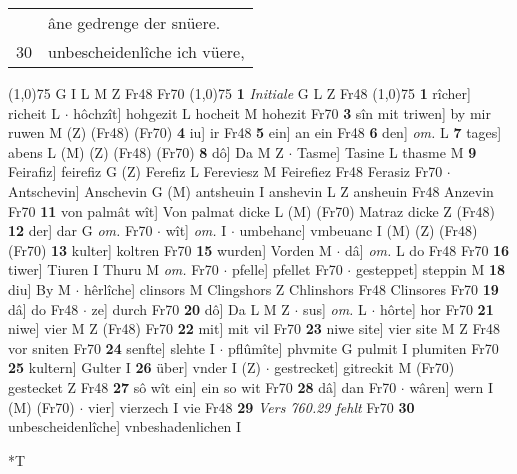 \documentclass[8pt,a4paper,notitlepage]{article}
\begin{document}
\begin{table}[ht]
\begin{minipage}[t]{0.5\linewidth}
\begin{tabular}{rl}
 & âne gedrenge der snüere.\\ 
30 & unbescheidenlîche ich vüere,\\ 
\end{tabular}
\scriptsize
\line(1,0){75} \newline
G I L M Z Fr48 Fr70 \newline
\line(1,0){75} \newline
\textbf{1} \textit{Initiale} G L Z Fr48  \newline
\line(1,0){75} \newline
\textbf{1} rîcher] richeit L  $\cdot$ hôchzît] hohgezit L hocheit M hohezit Fr70 \textbf{3} sîn mit triwen] by mir ruwen M (Z) (Fr48) (Fr70) \textbf{4} iu] ir Fr48 \textbf{5} ein] an ein Fr48 \textbf{6} den] \textit{om.} L \textbf{7} tages] abens L (M) (Z) (Fr48) (Fr70) \textbf{8} dô] Da M Z  $\cdot$ Tasme] Tasine L thasme M \textbf{9} Feirafiz] feirefiz G (Z) Ferefiz L Fereviesz M Feirefiez Fr48 Ferasiz Fr70  $\cdot$ Antschevin] Anschevin G (M) antsheuin I anshevin L Z ansheuin Fr48 Anzevin Fr70 \textbf{11} von palmât wît] Von palmat dicke L (M) (Fr70) Matraz dicke Z (Fr48) \textbf{12} der] dar G \textit{om.} Fr70  $\cdot$ wît] \textit{om.} I  $\cdot$ umbehanc] vmbeuanc I (M) (Z) (Fr48) (Fr70) \textbf{13} kulter] koltren Fr70 \textbf{15} wurden] Vorden M  $\cdot$ dâ] \textit{om.} L do Fr48 Fr70 \textbf{16} tiwer] Tiuren I Thuru M \textit{om.} Fr70  $\cdot$ pfelle] pfellet Fr70  $\cdot$ gesteppet] steppin M \textbf{18} diu] By M  $\cdot$ hêrlîche] clinsors M Clingshors Z Chlinshors Fr48 Clinsores Fr70 \textbf{19} dâ] do Fr48  $\cdot$ ze] durch Fr70 \textbf{20} dô] Da L M Z  $\cdot$ sus] \textit{om.} L  $\cdot$ hôrte] hor Fr70 \textbf{21} niwe] vier M Z (Fr48) Fr70 \textbf{22} mit] mit vil Fr70 \textbf{23} niwe site] vier site M Z Fr48 vor sniten Fr70 \textbf{24} senfte] slehte I  $\cdot$ pflûmîte] phvmite G pulmit I plumiten Fr70 \textbf{25} kultern] Gulter I \textbf{26} über] vnder I (Z)  $\cdot$ gestrecket] gitreckit M (Fr70) gestecket Z Fr48 \textbf{27} sô wît ein] ein so wit Fr70 \textbf{28} dâ] dan Fr70  $\cdot$ wâren] wern I (M) (Fr70)  $\cdot$ vier] vierzech I vie Fr48 \textbf{29} \textit{Vers 760.29 fehlt} Fr70  \textbf{30} unbescheidenlîche] vnbeshadenlichen I \newline
\end{minipage}
\hspace{0.5cm}
\begin{minipage}[t]{0.5\linewidth}
\small
\begin{center}*T
\end{center}

\end{minipage}
\end{table}
\end{document}
